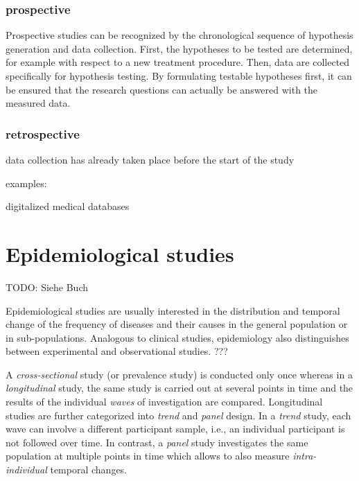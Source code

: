 \documentclass[
  oneside]{book}
\begin{document}
\hypertarget{prospective}{%
\subsubsection{prospective}\label{prospective}}

Prospective studies can be recognized by the chronological sequence of hypothesis generation and data collection.
First, the hypotheses to be tested are determined, for example with respect to a new treatment procedure.
Then, data are collected specifically for hypothesis testing.
By formulating testable hypotheses first, it can be ensured that the research questions can actually be answered with the measured data.

\hypertarget{retrospective}{%
\subsubsection{retrospective}\label{retrospective}}

data collection has already taken place before the start of the study

examples:

digitalized medical databases

\hypertarget{epidemiological-studies}{%
\section{Epidemiological studies}\label{epidemiological-studies}}

TODO: Siehe Buch

Epidemiological studies are usually interested in the distribution and temporal change of the frequency of diseases and their causes in the general population or in sub-populations.
Analogous to clinical studies, epidemiology also distinguishes between experimental and observational studies. ???

A \emph{cross-sectional} study (or prevalence study) is conducted only once whereas in a \emph{longitudinal} study, the same study is carried out at several points in time and the results of the individual \emph{waves} of investigation are compared.
Longitudinal studies are further categorized into \emph{trend} and \emph{panel} design.
In a \emph{trend} study, each wave can involve a different participant sample, i.e., an individual participant is not followed over time.
In contrast, a \emph{panel} study investigates the same population at multiple points in time which allows to also measure \emph{intra-individual} temporal changes.
\end{document}
